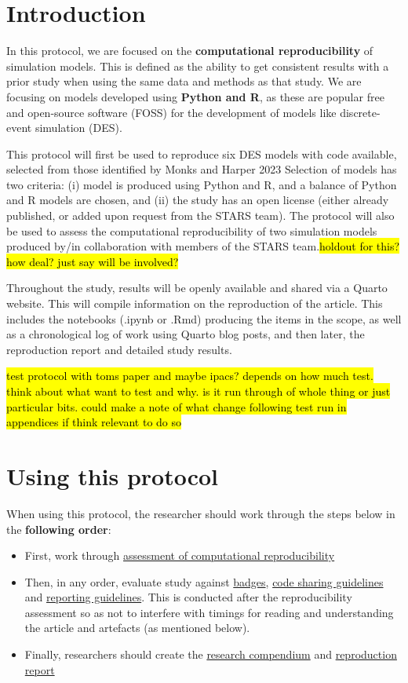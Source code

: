 \section{Introduction}

In this protocol, we are focused on the \textbf{computational reproducibility} of simulation models. This is defined as the ability to get consistent results with a prior study when using  the same data and methods as that study. We are focusing on models developed using \textbf{Python and R}, as these are popular free and open-source software (FOSS) for the development of models like discrete-event simulation (DES).\autocite{monks_computer_2023}

This protocol will first be used to reproduce six DES models with code available, selected from those identified by Monks and Harper 2023\autocite{monks_computer_2023} Selection of models has two criteria: (i) model is produced using Python and R, and a balance of Python and R models are chosen, and (ii) the study has an open license (either already published, or added upon request from the STARS team). The protocol will also be used to assess the computational reproducibility of two simulation models produced by/in collaboration with members of the STARS team.\hl{holdout for this? how deal? just say will be involved?}

Throughout the study, results will be openly available and shared via a Quarto website. This will compile information on the reproduction of the article. This includes the notebooks (.ipynb or .Rmd) producing the items in the scope, as well as a chronological log of work using Quarto blog posts, and then later, the reproduction report and detailed study results.

\hl{test protocol with toms paper and maybe ipacs? depends on how much test. think about what want to test and why. is it run through of whole thing or just particular bits. could make a note of what change following test run in appendices if think relevant to do so}

\vspace{2cm}
\section{Using this protocol}

When using this protocol, the researcher should work through the steps below in the \textbf{following order}:
\begin{itemize}
    \item First, work through \hyperref[sec:reproduce]{assessment of computational reproducibility}
    \item Then, in any order, evaluate study against \hyperref[sec:badges]{badges}, \hyperref[sec:code]{code sharing guidelines} and \hyperref[sec:reporting]{reporting guidelines}. This is conducted after the reproducibility assessment so as not to interfere with timings for reading and understanding the article and artefacts (as mentioned below).
    \item Finally, researchers should create the \hyperref[sec:compendium]{research compendium} and \hyperref[sec:report]{reproduction report}
\end{itemize}

